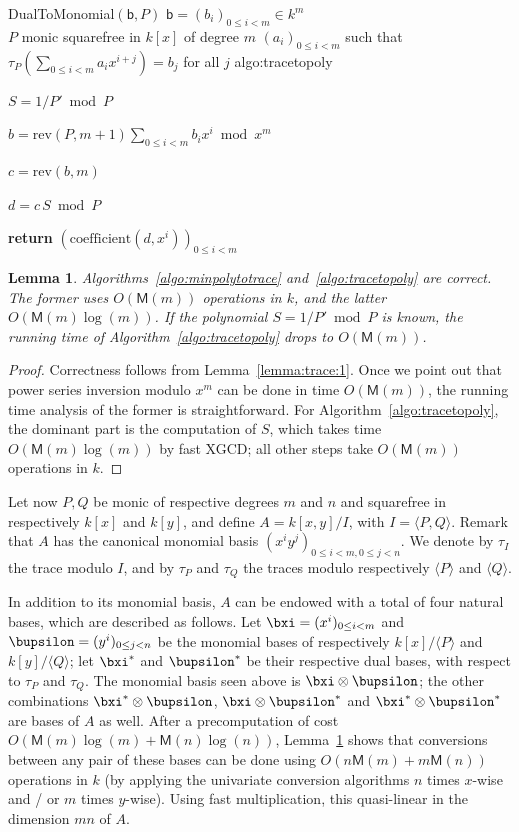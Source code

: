 \documentclass{sig-alternate}
\def\M {\ensuremath{\mathsf{M}}}
\def\vb {\ensuremath{\mathsf{b}}}
\def\coeff {\ensuremath{\mathrm{coefficient}}}
\def\rev {\ensuremath{\mathrm{rev}}}
\newcounter{algo}
\newenvironment{algorithm_endline}[4]{\small\begin{center}\begin{minipage}{0.48\textwidth}
      \refstepcounter{algo}
      \label{#4}
      \sf
      \rule{\textwidth}{0.2pt}\\
      \makebox[\textwidth][c]{Algorithm~\arabic{algo}:~\textbf{#1}}\\
      \rule[0.5\baselineskip]{\textwidth}{0.2pt}\\

      \vspace{-12pt}

      \parbox{\textwidth}{\textbf{Input} #2}
      \parbox{\textwidth}{\textbf{Output} #3}

\vspace{-7pt}

      \begin{enumerate*}}{\end{enumerate*}
      \vspace{-11pt}
      \rule{\textwidth}{0.2pt}
\end{minipage}\end{center}
}
\newcommand{\ang}[1]{\langle#1\rangle}
\newtheorem{Lemma}{Lemma}
\begin{document}
\begin{algorithm_endline}
{DualToMonomial$(\vb, P)$}
{$\vb=(b_i)_{0 \le i < m} \in k^m$\\ $P$ monic squarefree in $k[x]$ of degree $m$}
{$(a_i)_{0 \le i < m}$ such that $\tau_P(\sum_{0 \le i < m} a_i x^{i+j}) = b_j$ for all $j$}
{algo:tracetopoly}
\item $S = 1/P' \bmod P$
\item $b= \rev(P,m+1) \sum_{0 \le i < m} b_i x^i \bmod x^m$
\item $c= \rev(b, m)$
\item $d =c\, S \bmod P$
\item {\bf return} $(\coeff(d,x^i))_{0 \le i < m}$
\end{algorithm_endline}

\begin{Lemma}\label{lemma:uniconv}
  Algorithms~\ref{algo:minpolytotrace} and~\ref{algo:tracetopoly} are
  correct. The former uses $O(\M(m))$ operations in $k$, and the
  latter $O(\M(m)\log(m))$.  If the polynomial $S=1/P' \bmod P$ is
  known, the running time of Algorithm~\ref{algo:tracetopoly} drops to
  $O(\M(m))$.
\end{Lemma}
\begin{proof}
  Correctness follows from Lemma~\ref{lemma:trace:1}.  Once we point
  out that power series inversion modulo $x^m$ can be done in time
  $O(\M(m))$, the running time analysis of the former is
  straightforward. For Algorithm~\ref{algo:tracetopoly}, the dominant
  part is the computation of $S$, which takes time $O(\M(m)\log(m))$
  by fast XGCD; all other steps take $O(\M(m))$ operations in $k$.
\end{proof}

 Let now $P,Q$ be monic of
respective degrees $m$ and $n$ and squarefree in respectively $k[x]$
and $k[y]$, and define $A=k[x,y]/I$, with $I=\ang{P,Q}$. Remark that
$A$ has the canonical monomial basis $(x^i y^j)_{0 \le i <m, 0 \le j <
  n}$. %
We
denote by $\tau_I$ the trace modulo $I$, and by $\tau_P$ and $\tau_Q$
the traces modulo respectively $\ang{P}$ and $\ang{Q}$.

In addition to its monomial basis, $A$ can be endowed with a total of
four natural bases, which are described as follows. Let $\bxi=(x^i)_{0
  \le i < m}$ and $\bupsilon=(y^i)_{0 \le j < n}$ be the monomial
bases of respectively $k[x]/\ang{P}$ and $k[y]/\ang{Q}$; let
$\bxi^\ast$ and $\bupsilon^\ast$ be their respective dual bases, with
respect to $\tau_P$ and $\tau_Q$. The monomial basis seen above is
$\bxi \otimes \bupsilon$; the other combinations $\bxi^\ast \otimes
\bupsilon$, $\bxi \otimes \bupsilon^\ast$ and $\bxi^\ast \otimes
\bupsilon^\ast$ are bases of $A$ as well. After a precomputation of
cost $O(\M(m)\log(m) + \M(n)\log(n))$, Lemma~\ref{lemma:uniconv} shows
that conversions between any pair of these bases can be done using
$O(n\M(m)+m\M(n))$ operations in $k$ (by applying the univariate
conversion algorithms $n$ times $x$-wise and / or $m$ times
$y$-wise). Using fast multiplication, this quasi-linear in the
dimension $mn$ of $A$.
\end{document}
